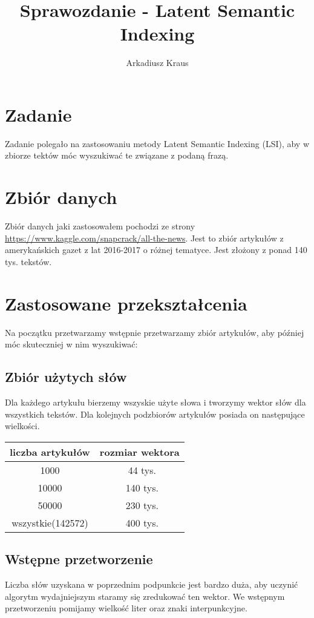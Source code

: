 \documentclass{article}
\begin{document}
\title{Sprawozdanie - Latent Semantic Indexing}
\author{Arkadiusz Kraus}

\maketitle


\section{Zadanie}
Zadanie polegało na zastosowaniu metody Latent Semantic Indexing (LSI), aby w zbiorze tektów móc wyszukiwać te związane z podaną frazą.

\section{Zbiór danych}
Zbiór danych jaki zastosowałem pochodzi ze strony \url{https://www.kaggle.com/snapcrack/all-the-news}. Jest to zbiór artykułów z amerykańskich gazet z lat 2016-2017 o różnej tematyce. Jest złożony z ponad 140 tys. tekstów.

\section{Zastosowane przekształcenia}
Na początku przetwarzamy wstępnie przetwarzamy zbiór artykułów, aby później móc skuteczniej w nim wyszukiwać:
\subsection{Zbiór użytych słów}
Dla każdego artykułu bierzemy wszyskie użyte słowa i tworzymy wektor słów dla wszystkich tekstów. Dla kolejnych podzbiorów artykułów posiada on następujące wielkości.
\begin{center}
	\begin{tabular}{c|c}
	liczba artykułów & rozmiar wektora \\ \hline
	1000 &  ~44 tys. \\ \hline
	10000 & ~140 tys.\\ \hline
	50000 & ~230 tys.\\ \hline
	wszystkie(142572) & ~400 tys.\\
	\end{tabular}
\end{center}
\subsection{Wstępne przetworzenie}
Liczba słów uzyskana w poprzednim podpunkcie jest bardzo duża, aby uczynić algorytm wydajniejszym staramy się zredukować ten wektor. We wstępnym przetworzeniu pomijamy wielkość liter oraz znaki interpunkcyjne.
\end{document}
